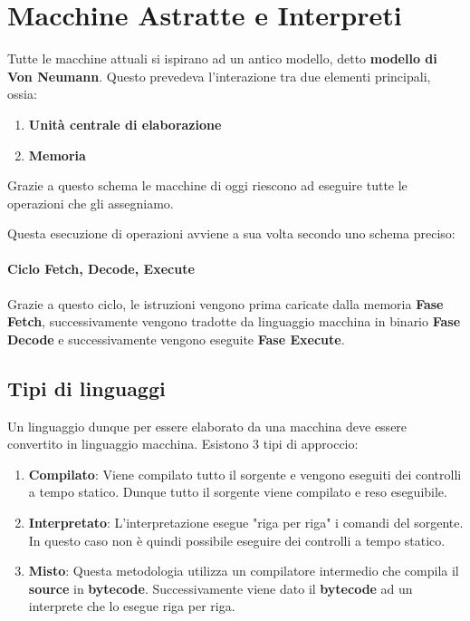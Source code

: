 \documentclass{article}
\begin{document}
\newpage

\section{Macchine Astratte e Interpreti}

Tutte le macchine attuali si ispirano ad un antico modello, detto \textbf{modello di Von Neumann}. Questo prevedeva l'interazione tra due elementi principali, ossia:
\begin{enumerate}
    \item \textbf{Unità centrale di elaborazione}
    \item \textbf{Memoria}
\end{enumerate}

Grazie a questo schema le macchine di oggi riescono ad eseguire tutte le operazioni che gli assegniamo.

Questa esecuzione di operazioni avviene a sua volta secondo uno schema preciso:

\paragraph{Ciclo Fetch, Decode, Execute} Grazie a questo ciclo, le istruzioni vengono prima caricate dalla memoria \textbf{Fase Fetch}, successivamente vengono tradotte da linguaggio macchina in binario \textbf{Fase Decode} e successivamente vengono eseguite \textbf{Fase Execute}.

\subsection{Tipi di linguaggi} Un linguaggio dunque per essere elaborato da una macchina deve essere convertito in linguaggio macchina. Esistono 3 tipi di approccio:

\begin{enumerate}
    \item \textbf{Compilato}: Viene compilato tutto il sorgente e vengono eseguiti dei controlli a tempo statico. Dunque tutto il sorgente viene compilato e reso eseguibile.
    \item \textbf{Interpretato}: L'interpretazione esegue "riga per riga" i comandi del sorgente. In questo caso non è quindi possibile eseguire dei controlli a tempo statico.
    \item \textbf{Misto}: Questa metodologia utilizza un compilatore intermedio che compila il \textbf{source} in \textbf{bytecode}. Successivamente viene dato il \textbf{bytecode} ad un interprete che lo esegue riga per riga.
\end{enumerate}
\end{document}
